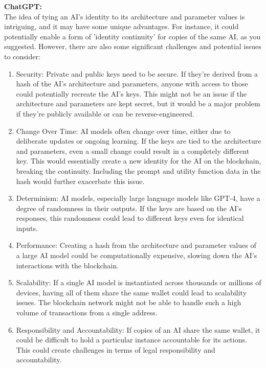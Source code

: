 \documentclass{article}[10pt]
\begin{document}
\noindent \textbf{ChatGPT:}\\
The idea of tying an AI's identity to its architecture and parameter values is intriguing, and it may have some unique advantages. 
For instance, it could potentially enable a form of 'identity continuity' for copies of the same AI, as you suggested. 
However, there are also some significant challenges and potential issues to consider:
\begin{enumerate}
    \item Security: 
    Private and public keys need to be secure. 
    If they're derived from a hash of the AI's architecture and parameters, anyone with access to those could potentially recreate the AI's keys. 
    This might not be an issue if the architecture and parameters are kept secret, but it would be a major problem if they're publicly available or can be reverse-engineered.
    \item Change Over Time: 
    AI models often change over time, either due to deliberate updates or ongoing learning. 
    If the keys are tied to the architecture and parameters, even a small change could result in a completely different key. 
    This would essentially create a new identity for the AI on the blockchain, breaking the continuity. 
    Including the prompt and utility function data in the hash would further exacerbate this issue.
    \item Determinism: 
    AI models, especially large language models like GPT-4, have a degree of randomness in their outputs. 
    If the keys are based on the AI's responses, this randomness could lead to different keys even for identical inputs.
    \item Performance: 
    Creating a hash from the architecture and parameter values of a large AI model could be computationally expensive, slowing down the AI's interactions with the blockchain. 
    \item Scalability: 
    If a single AI model is instantiated across thousands or millions of devices, having all of them share the same wallet could lead to scalability issues. 
    The blockchain network might not be able to handle such a high volume of transactions from a single address.
    \item Responsibility and Accountability: 
    If copies of an AI share the same wallet, it could be difficult to hold a particular instance accountable for its actions. 
    This could create challenges in terms of legal responsibility and accountability.
\end{enumerate}
\end{document}
